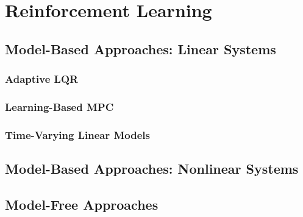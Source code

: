 \newpage

\section{Reinforcement Learning}

\subsection{Model-Based Approaches: Linear Systems}

\subsubsection{Adaptive LQR}



\subsubsection{Learning-Based MPC}


\subsubsection{Time-Varying Linear Models}



\subsection{Model-Based Approaches: Nonlinear Systems}




\subsection{Model-Free Approaches}

